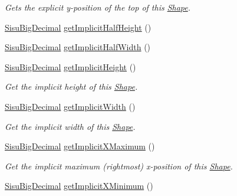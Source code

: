 \begin{DoxyCompactItemize}
\begin{DoxyCompactList}\small\item\em Gets the explicit y-\/position of the top of this \hyperlink{classcom_1_1aarrelaakso_1_1drawl_1_1_shape}{Shape}. \end{DoxyCompactList}\item 
\hyperlink{classcom_1_1aarrelaakso_1_1drawl_1_1_sisu_big_decimal}{Sisu\+Big\+Decimal} \hyperlink{classcom_1_1aarrelaakso_1_1drawl_1_1_shape_a33908342a13df06645b6ab7c1fd7a801}{get\+Implicit\+Half\+Height} ()
\item 
\hyperlink{classcom_1_1aarrelaakso_1_1drawl_1_1_sisu_big_decimal}{Sisu\+Big\+Decimal} \hyperlink{classcom_1_1aarrelaakso_1_1drawl_1_1_shape_a46d1d2823bc131d796a6a41383334d85}{get\+Implicit\+Half\+Width} ()
\item 
\hyperlink{classcom_1_1aarrelaakso_1_1drawl_1_1_sisu_big_decimal}{Sisu\+Big\+Decimal} \hyperlink{classcom_1_1aarrelaakso_1_1drawl_1_1_shape_a76f8b3c8365af3e5800ad06113b3e507}{get\+Implicit\+Height} ()
\begin{DoxyCompactList}\small\item\em Get the implicit height of this \hyperlink{classcom_1_1aarrelaakso_1_1drawl_1_1_shape}{Shape}. \end{DoxyCompactList}\item 
\hyperlink{classcom_1_1aarrelaakso_1_1drawl_1_1_sisu_big_decimal}{Sisu\+Big\+Decimal} \hyperlink{classcom_1_1aarrelaakso_1_1drawl_1_1_shape_af6a043538a5aba4f4b3eb7278206a841}{get\+Implicit\+Width} ()
\begin{DoxyCompactList}\small\item\em Get the implicit width of this \hyperlink{classcom_1_1aarrelaakso_1_1drawl_1_1_shape}{Shape}. \end{DoxyCompactList}\item 
\hyperlink{classcom_1_1aarrelaakso_1_1drawl_1_1_sisu_big_decimal}{Sisu\+Big\+Decimal} \hyperlink{classcom_1_1aarrelaakso_1_1drawl_1_1_shape_a3bde9d5b2cc582ddb6c521b122c40ff8}{get\+Implicit\+X\+Maximum} ()
\begin{DoxyCompactList}\small\item\em Get the implicit maximum (rightmost) x-\/position of this \hyperlink{classcom_1_1aarrelaakso_1_1drawl_1_1_shape}{Shape}. \end{DoxyCompactList}\item 
\hyperlink{classcom_1_1aarrelaakso_1_1drawl_1_1_sisu_big_decimal}{Sisu\+Big\+Decimal} \hyperlink{classcom_1_1aarrelaakso_1_1drawl_1_1_shape_af0ceac29118047c73bd3ff308a71c36f}{get\+Implicit\+X\+Minimum} ()

\end{DoxyCompactItemize}
